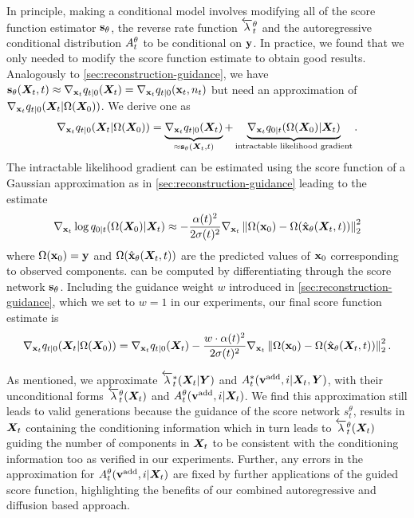 In principle, making a conditional model involves modifying all of the score function estimator ${\mathbf{s}}_\theta$, the reverse rate function $\overleftarrow{\lambda}_t^\theta$ and the autoregressive conditional distribution $A_t^\theta$ to be conditional on ${\mathbf{y}}$. In practice, we found that we only needed to modify the score function estimate to obtain good results. Analogously to \cref{sec:reconstruction-guidance}, we have ${\mathbf{s}}_\theta({\bm{X}}_t, t) \approx \nabla_{{\mathbf{x}}_t} q_{t|0} ({\bm{X}}_t) = \nabla_{{\mathbf{x}}_t} q_{t|0} ({\mathbf{x}}_t, n_t)$ but need an approximation of $\nabla_{{\mathbf{x}}_t} q_{t|0} ({\bm{X}}_t | \Omega({\bm{X}}_0))$. We derive one as
\begin{align}
    \nabla_{{\mathbf{x}}_t} q_{t|0} ({\bm{X}}_t | \Omega({\bm{X}}_0)) = \underbrace{\nabla_{{\mathbf{x}}_t} q_{t|0} ({\bm{X}}_t)}_{\approx {\mathbf{s}}_\theta({\bm{X}}_t, t)} + \underbrace{\nabla_{{\mathbf{x}}_t} q_{0|t} (\Omega({\bm{X}}_0) | {\bm{X}}_t)}_\text{intractable likelihood gradient}.
\end{align}
The intractable likelihood gradient can be estimated using the score function of a Gaussian approximation as in \cref{sec:reconstruction-guidance} leading to the estimate
\begin{equation} \label{eq:tddm-guidance-term}
    \nabla_{{\mathbf{x}}_t} \log q_{0|t}(\Omega({\bm{X}}_0) | {\bm{X}}_t) \approx - \frac{\alpha(t)^2}{2\sigma(t)^2} \nabla_{{\mathbf{x}}_t} \left\lVert\Omega({\mathbf{x}}_0) - \Omega(\hat{{\mathbf{x}}}_\theta({\bm{X}}_t, t)) \right\rVert^2_2
\end{equation}
where $\Omega({\mathbf{x}}_0) = {\mathbf{y}}$ and $\Omega(\hat{{\mathbf{x}}}_\theta({\bm{X}}_t, t))$ are the predicted values of ${\mathbf{x}}_0$ corresponding to observed components.  can be computed by differentiating through the score network ${\mathbf{s}}_\theta$. Including the guidance weight $w$ introduced in \cref{sec:reconstruction-guidance}, which we set to $w = 1$ in our experiments, our final score function estimate is
\begin{equation} \label{eq:tddm-guidance-score}
    \nabla_{{\mathbf{x}}_t} q_{t|0} ({\bm{X}}_t | \Omega({\bm{X}}_0)) = \nabla_{{\mathbf{x}}_t} q_{t|0} ({\bm{X}}_t) - \frac{w \cdot \alpha(t)^2}{2\sigma(t)^2} \nabla_{{\mathbf{x}}_t} \left\lVert\Omega({\mathbf{x}}_0) - \Omega(\hat{{\mathbf{x}}}_\theta({\bm{X}}_t, t)) \right\rVert^2_2.
\end{equation}

As mentioned, we approximate $\overleftarrow{\lambda}_t^*({\bm{X}}_t | {\bm{Y}})$ and $A_t^*({\mathbf{v}}^{\textup{add}}, i | {\bm{X}}_t, {\bm{Y}})$, with their unconditional forms $\overleftarrow{\lambda}_t^\theta({\bm{X}}_t)$ and $A_t^\theta({\mathbf{v}}^{\textup{add}}, i | {\bm{X}}_t)$. We find this approximation still leads to valid generations because the guidance of the score network $s_t^\theta$, results in ${\bm{X}}_t$ containing the conditioning information which in turn leads to $\overleftarrow{\lambda}_t^\theta({\bm{X}}_t)$ guiding the number of components in ${\bm{X}}_t$ to be consistent with the conditioning information too as verified in our experiments. Further, any errors in the approximation for $A_t^\theta({\mathbf{v}}^{\textup{add}}, i | {\bm{X}}_t)$ are fixed by further applications of the guided score function, highlighting the benefits of our combined autoregressive and diffusion based approach.


